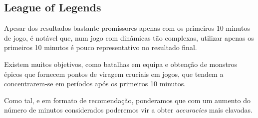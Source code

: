 \subsection{League of Legends}

Apesar dos resultados bastante promissores apenas com os primeiros 10 minutos de jogo, é notável que, num jogo com dinâmicas tão complexas, utilizar apenas os primeiros 10 minutos é pouco representativo no resultado final.

Existem muitos objetivos, como batalhas em equipa e obtenção de monstros épicos que fornecem pontos de viragem cruciais em jogos, que tendem a concentrarem-se em períodos após os primeiros 10 minutos.

Como tal, e em formato de recomendação, ponderamos que com um aumento do número de minutos considerados poderemos vir a obter \textit{accuracies} mais elavadas.